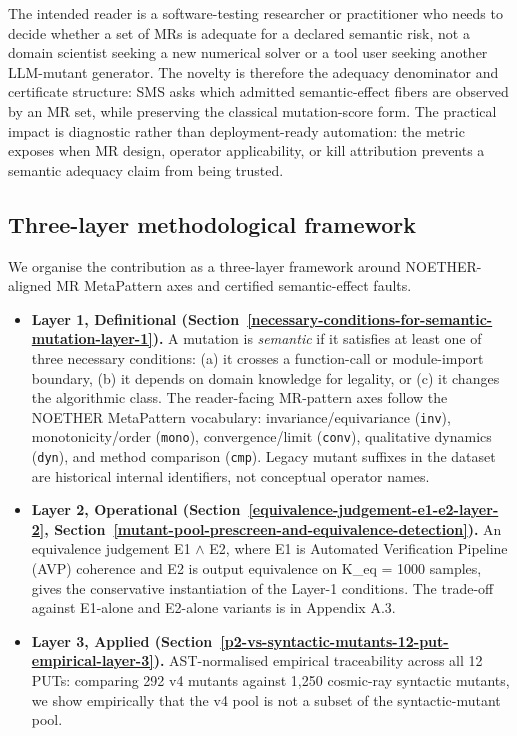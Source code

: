 \documentclass[manuscript,screen,review]{acmart}
\begin{document}
The intended reader is a software-testing researcher or practitioner who
needs to decide whether a set of MRs is adequate for a declared semantic
risk, not a domain scientist seeking a new numerical solver or a tool
user seeking another LLM-mutant generator. The novelty is therefore the
adequacy denominator and certificate structure: SMS asks which admitted
semantic-effect fibers are observed by an MR set, while preserving the
classical mutation-score form. The practical impact is diagnostic rather
than deployment-ready automation: the metric exposes when MR design,
operator applicability, or kill attribution prevents a semantic adequacy
claim from being trusted.

\subsection{Three-layer methodological framework}\label{three-layer-methodological-framework}

We organise the contribution as a three-layer framework around
NOETHER-aligned MR MetaPattern axes and certified semantic-effect
faults.

\begin{itemize}

\item
  \textbf{Layer 1, Definitional (Section~\ref{necessary-conditions-for-semantic-mutation-layer-1}).} A mutation is \emph{semantic}
  if it satisfies at least one of three necessary conditions: (a) it
  crosses a function-call or module-import boundary, (b) it depends on
  domain knowledge for legality, or (c) it changes the algorithmic
  class. The reader-facing MR-pattern axes follow the NOETHER
  MetaPattern vocabulary: invariance/equivariance (\texttt{inv}),
  monotonicity/order (\texttt{mono}), convergence/limit
  (\texttt{conv}), qualitative dynamics (\texttt{dyn}), and method
  comparison (\texttt{cmp}). Legacy mutant suffixes in the dataset are
  historical internal identifiers, not conceptual operator names.
\item
  \textbf{Layer 2, Operational (Section~\ref{equivalence-judgement-e1-e2-layer-2}, Section~\ref{mutant-pool-prescreen-and-equivalence-detection}).} An equivalence judgement
  E1 $\wedge$ E2, where E1 is Automated Verification Pipeline (AVP) coherence
  and E2 is output equivalence on K\_eq = 1000 samples, gives the
  conservative instantiation of the Layer-1 conditions. The trade-off
  against E1-alone and E2-alone variants is in Appendix A.3.
\item
  \textbf{Layer 3, Applied (Section~\ref{p2-vs-syntactic-mutants-12-put-empirical-layer-3}).} AST-normalised empirical
  traceability across all 12 PUTs: comparing 292 v4 mutants against
  1,250 cosmic-ray syntactic mutants, we show empirically that the v4
  pool is not a subset of the syntactic-mutant pool.
\end{itemize}
\end{document}
